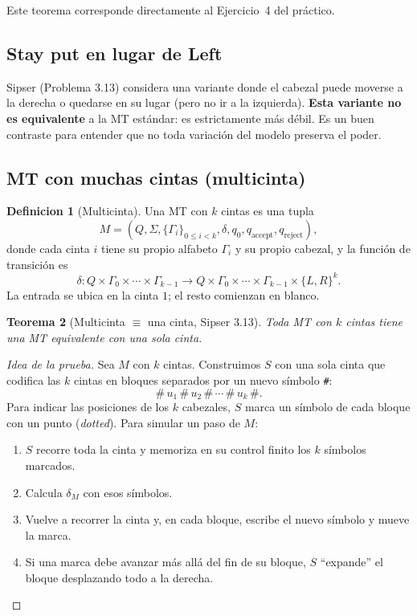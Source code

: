 \documentclass[11pt,a4paper]{article}
\theoremstyle{plain}
\newtheorem{teorema}{Teorema}[section]
\theoremstyle{definition}
\newtheorem{definicion}[teorema]{Definicion}
\theoremstyle{remark}
\newcommand{\qaccept}{q_{\text{accept}}}
\newcommand{\qreject}{q_{\text{reject}}}
\begin{document}
Este teorema corresponde directamente al Ejercicio~4 del pr\'actico.

\subsection{Stay put en lugar de Left}

Sipser (Problema 3.13) considera una variante donde el cabezal puede
moverse a la derecha o quedarse en su lugar (pero no ir a la izquierda).
\textbf{Esta variante no es equivalente} a la MT est\'andar: es estrictamente
m\'as d\'ebil. Es un buen contraste para entender que no toda variaci\'on
del modelo preserva el poder.

\subsection{MT con muchas cintas (multicinta)}

\begin{definicion}[Multicinta]
Una MT con $k$ cintas es una tupla
\[
  M = (Q, \Sigma, \{\Gamma_i\}_{0\le i<k}, \delta, q_0, \qaccept, \qreject),
\]
donde cada cinta $i$ tiene su propio alfabeto $\Gamma_i$ y su propio cabezal,
y la funci\'on de transici\'on es
\[
  \delta : Q \times \Gamma_0 \times \cdots \times \Gamma_{k-1}
        \to Q \times \Gamma_0 \times \cdots \times \Gamma_{k-1} \times \{L,R\}^k.
\]
La entrada se ubica en la cinta $1$; el resto comienzan en blanco.
\end{definicion}

\begin{teorema}[Multicinta $\equiv$ una cinta, Sipser 3.13]
\label{teo:multi-equiv}
Toda MT con $k$ cintas tiene una MT equivalente con una sola cinta.
\end{teorema}

\begin{proof}[Idea de la prueba]
Sea $M$ con $k$ cintas. Construimos $S$ con una sola cinta que codifica las
$k$ cintas en bloques separados por un nuevo s\'imbolo \texttt{\#}:
\[
  \texttt{\#}\,u_1\,\texttt{\#}\,u_2\,\texttt{\#}\,\cdots\,\texttt{\#}\,u_k\,\texttt{\#}.
\]
Para indicar las posiciones de los $k$ cabezales, $S$ marca un s\'imbolo de
cada bloque con un punto (\emph{dotted}). Para simular un paso de $M$:
\begin{enumerate}
  \item $S$ recorre toda la cinta y memoriza en su control finito los $k$
        s\'imbolos marcados.
  \item Calcula $\delta_M$ con esos s\'imbolos.
  \item Vuelve a recorrer la cinta y, en cada bloque, escribe el nuevo
        s\'imbolo y mueve la marca.
  \item Si una marca debe avanzar m\'as all\'a del fin de su bloque, $S$
        ``expande'' el bloque desplazando todo a la derecha.
\end{enumerate}
\end{proof}
\end{document}
